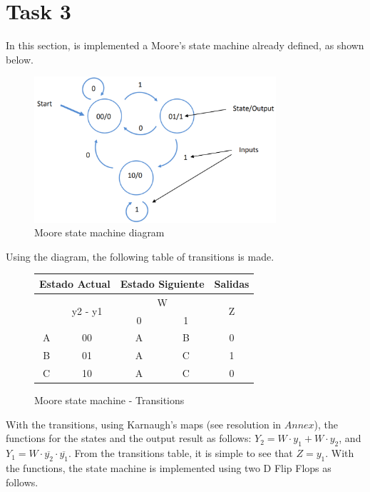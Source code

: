 \newpage

\section*{Task 3}

In this section, is implemented a Moore's state
machine already defined, as shown below.

\begin{figure}[H]
    \begin{centering}
    \includegraphics[width=0.8\textwidth]{data/Graficos3/3a_fsm.png}
    \par\end{centering}
    \caption{Moore state machine diagram}
\end{figure}

Using the diagram, the following table of transitions 
is made.

\begin{figure}[H]
\begin{center}
\begin{tabular}{|c|c|c|c||c|}
    \hline 
    \multicolumn{2}{|c|}{Estado Actual} & \multicolumn{2}{c||}{Estado Siguiente} & \multicolumn{1}{c|}{Salidas}\tabularnewline
    \hline 
    \hline 
    \multirow{2}{*}{} & \multirow{2}{*}{y2 - y1} & \multicolumn{2}{c||}{W} & \multirow{2}{*}{Z}\tabularnewline
    \cline{3-4} 
     &  & \multicolumn{1}{c|}{0} & \multicolumn{1}{c||}{1} & \tabularnewline
    \hline 
    A & 00 & A & B & 0\tabularnewline
    \hline 
    B & 01 & A & C & 1\tabularnewline
    \hline 
    C & 10 & A & C & 0\tabularnewline
    \hline 
    \end{tabular}
    \caption{Moore state machine - Transitions}
\end{center}
\end{figure}
With the transitions, using Karnaugh's maps (see resolution in $Annex$), the 
functions for the states and the output result as follows: $Y_2 = W \cdot y_1 + W \cdot y_2$, and $Y_1 = W \cdot \overline{y_2} \cdot \overline{y_1}$. 
\newpage
From the transitions table, it is simple to see that $Z = y_1$.
With the functions, the state machine is implemented 
using two D Flip Flops as follows. 

